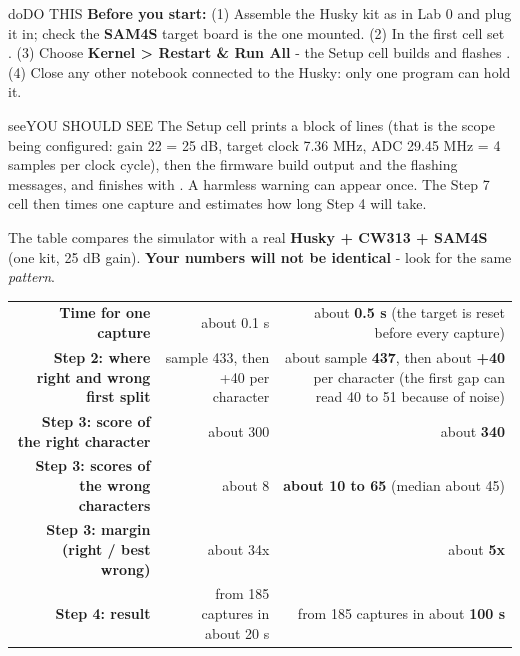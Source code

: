 \documentclass[11pt,letterpaper]{article}
\begin{document}
\begin{guidecallout}{do}{DO THIS}
\textbf{Before you start:} (1) Assemble the Husky kit as in Lab 0 and plug it in; check the \textbf{SAM4S} target
board is the one mounted. (2) In the first cell set . (3) Choose \textbf{Kernel
\textgreater{} Restart \& Run All} - the Setup cell builds and flashes . (4) Close any other
notebook connected to the Husky: only one program can hold it.
\end{guidecallout}

\begin{guidecallout}{see}{YOU SHOULD SEE}
The Setup cell prints a block of  lines (that is the scope being configured: gain 22 = 25 dB, target clock 7.36 MHz, ADC 29.45 MHz =
4 samples per clock cycle), then the firmware build output and the flashing messages, and finishes with . A harmless  warning can appear once.
The Step 7 cell then times one capture and estimates how long Step 4 will take.
\end{guidecallout}


The table compares the simulator with a real \textbf{Husky + CW313 + SAM4S} (one kit, 25 dB gain). \textbf{Your
numbers will not be identical} - look for the same \emph{pattern}.

{\small{}
\begin{longtable}{|R{0.3188}|R{0.2754}|R{0.4058}|}
\hline
{} &  &  \\ \hline
\endhead
\textbf{Time for one capture} & about 0.1 s & about \textbf{0.5 s} (the target is reset before every capture) \\ \hline
\textbf{Step 2: where right and wrong first split} & sample 433, then +40 per character & about sample \textbf{437}, then about \textbf{+40} per character (the first gap can read 40 to 51 because of noise) \\ \hline
\textbf{Step 3: score of the right character} & about 300 & about \textbf{340} \\ \hline
\textbf{Step 3: scores of the wrong characters} & about 8 & \textbf{about 10 to 65} (median about 45) \\ \hline
\textbf{Step 3: margin (right / best wrong)} & about 34x & about \textbf{5x} \\ \hline
\textbf{Step 4: result} &  from 185 captures in about 20 s &  from 185 captures in about \textbf{100 s} \\ \hline
\end{longtable}}
\end{document}
